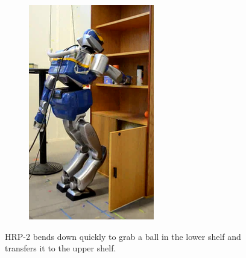 \begin{figure}
\begin{subfigure}{0.19\columnwidth}
    \includegraphics[width = \columnwidth]
                    {src/chap3-optimal-motion-planning/figure/shelves-10.png}
    \label{shelves-10}
  \end{subfigure}
  \caption{HRP-2 bends down quickly to grab a ball in the lower
    shelf and transfers it to the upper shelf.}
  \label{shelves}
\end{figure}

